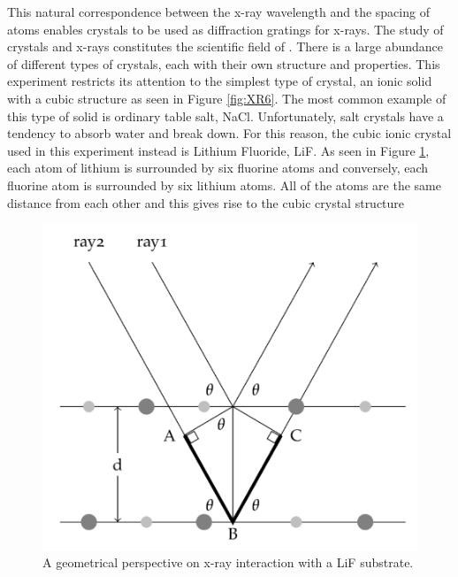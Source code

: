 \noindent This natural correspondence between the x-ray wavelength and the spacing of atoms enables crystals to be used as diffraction gratings for x-rays. The study of crystals and x-rays constitutes the scientific field of . There is a large abundance of different types of crystals, each with their own structure and properties. This experiment restricts its attention to the simplest type of crystal, an ionic solid with a cubic structure as seen in Figure \ref{fig:XR6}. The most common example of this type of solid is ordinary table salt, NaCl. Unfortunately, salt crystals have a tendency to absorb water and break down. For this reason, the cubic ionic crystal used in this experiment instead is Lithium Fluoride, LiF. As seen in Figure \ref{fig:XR7}, each atom of lithium is surrounded by six fluorine atoms and conversely, each fluorine atom is surrounded by six lithium atoms. All of the atoms are the same distance from each other and this gives rise to the cubic crystal structure

\begin{figure}[H]
    \centering
    \includegraphics[scale = 0.8]{Images/XR7.PNG}
    \caption{A geometrical perspective on x-ray interaction with a LiF substrate.}
    \label{fig:XR7}
\end{figure}

